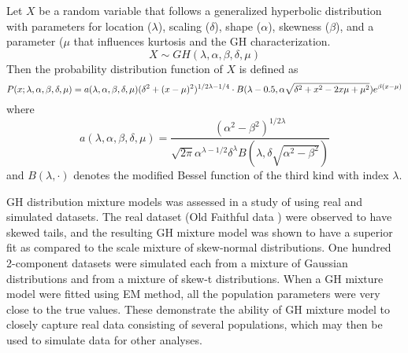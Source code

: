 Let \(X\) be a random variable that follows a generalized hyperbolic distribution with parameters for location (\(\lambda\)), scaling (\(\delta\)), shape (\(\alpha\)), skewness (\(\beta\)), and a parameter (\(\mu\) that influences kurtosis and the GH characterization. 
\[
    X \sim GH(\lambda, \alpha, \beta, \delta, \mu)
\]
Then the probability distribution function of \(X\) is defined as
\begin{equation}
    P(x; \lambda, \alpha, \beta, \delta, \mu) = a(\lambda, \alpha, \beta, \delta, \mu) (\delta^2+(x-\mu)^2)^{1/2\lambda-1/4} \\ \cdot B(\lambda-0.5, \alpha\sqrt{\delta^2+x^2-2x\mu+\mu^2})e^{\beta(x-\mu)}
\end{equation}
where
\[
    a(\lambda, \alpha, \beta, \delta, \mu) = \frac{(\alpha^2-\beta^2)^{1/2\lambda}}{\sqrt{2\pi}\alpha^{\lambda-1/2}\delta^\lambda B(\lambda, \delta\sqrt{\alpha^2 - \beta^2})}
\]
and \(B(\lambda, \cdot)\) denotes the modified Bessel function of the third kind with index \(\lambda\).

GH distribution mixture models was assessed in a study of  using real and simulated datasets. The real dataset (Old Faithful data \cite{GeyserTimes}) were observed to have skewed tails, and the resulting GH mixture model was shown to have a superior fit as compared to the scale mixture of skew-normal distributions. One hundred 2-component datasets were simulated each from a mixture of Gaussian distributions and from a mixture of skew-t distributions. When a GH mixture model were fitted using EM method, all the population parameters were very close to the true values. These demonstrate the ability of GH mixture model to closely capture real data consisting of several populations, which may then be used to simulate data for other analyses.